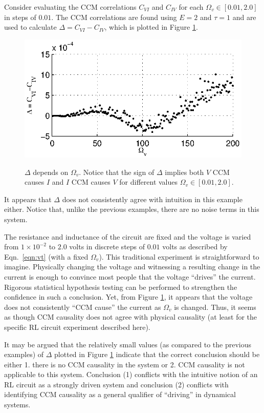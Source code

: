 \documentclass[twocolumn,aps,pre,groupedaddress]{revtex4-1}
\begin{document}
Consider evaluating the CCM correlations $C_{VI}$ and $C_{IV}$ for each $\Omega_v\in[0.01,2.0]$ in steps of $0.01$.  The CCM correlations are found using $E=2$ and $\tau=1$ and are used to calculate $\Delta = C_{VI}-C_{IV}$, which is plotted in Figure \ref{fig:Av}.
\begin{figure}[ht]
\includegraphics[scale=0.9]{RLCircuitVaryV_Freq.eps} \\
\caption{$\Delta$ depends on $\Omega_v$.  Notice that the sign of $\Delta$ implies both $V$ CCM causes $I$ and $I$ CCM causes $V$ for different values $\Omega_v\in[0.01,2.0]$.}
\label{fig:Av}
\end{figure}
It appears that $\Delta$ does not consistently agree with intuition in this example either.  Notice that, unlike the previous examples, there are no noise terms in this system.  

The resistance and inductance of the circuit are fixed and the voltage is varied from $1\times 10^{-2}$ to $2.0$ volts in discrete steps of $0.01$ volts as described by Eqn.\ \ref{eqn:vt} (with a fixed $\Omega_v$).  This traditional experiment is straightforward to imagine.  Physically changing the voltage and witnessing a resulting change in the current is enough to convince most people that the voltage ``drives'' the current.  Rigorous statistical hypothesis testing can be performed to strengthen the confidence in such a conclusion.  Yet, from Figure \ref{fig:Av}, it appears that the voltage does not consistently ``CCM cause'' the current as $\Omega_v$ is changed.  Thus, it seems as though CCM causality does not agree with physical causality (at least for the specific RL circuit experiment described here).

It may be argued that the relatively small values (as compared to the previous examples) of $\Delta$ plotted in Figure \ref{fig:Av} indicate that the correct conclusion should be either 1. there is no CCM causality in the system or 2. CCM causality is not applicable to this system.  Conclusion (1) conflicts with the intuitive notion of an RL circuit as a strongly driven system and conclusion (2) conflicts with identifying CCM causality as a general qualifier of ``driving'' in dynamical systems.
\end{document}
